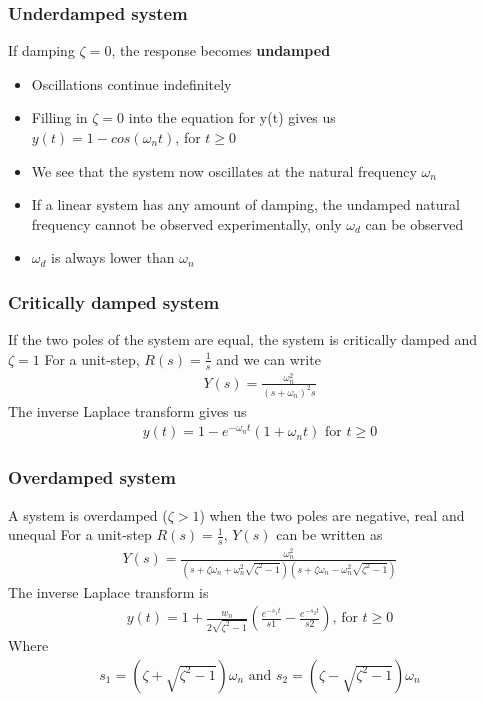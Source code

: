 \begin{frame}
\frametitle{Underdamped system}
If damping $\zeta=0$, the response becomes \textbf{undamped}
\begin{itemize}
\vspace{0.25cm}
\item Oscillations continue indefinitely
\vspace{0.25cm}
\item Filling in $\zeta=0$ into the equation for y(t) gives us\\
$y(t) = 1 -cos(\omega_n t)$, for $t\ge 0$
\vspace{0.25cm}
\item We see that the system now oscillates at the natural frequency $\omega_n$
\vspace{0.25cm}
\item If a linear system has any amount of damping, the undamped natural frequency cannot be observed experimentally, only $\omega_d$ can be observed
\vspace{0.25cm}
\item $\omega_d$ is always lower than $\omega_n$
\end{itemize} 
\end{frame}

\begin{frame}
\frametitle{Critically damped system}
If the two poles of the system are equal, the system is critically damped and $\zeta=1$
\vspace{0.75cm}
For a unit-step, $R(s)=\frac{1}{s}$ and we can write
\begin{align*}
Y(s) =\frac{\omega_n ^2}{(s+\omega_n)^2 s}
\end{align*}
The inverse Laplace transform gives us
\begin{align*}
y(t) = 1 - e^{-\omega_n t}(1+\omega_n t) \text{ for } t\ge 0
\end{align*}         
\end{frame}

\begin{frame}
\frametitle{Overdamped system}
A system is overdamped ($\zeta>1$) when the two poles are negative, real and unequal
\vspace{0.25cm}
For a unit-step $R(s)=\frac{1}{s}$, $Y(s)$ can be written as
\vspace{-0.5cm}
\begin{align*}
Y(s) = \frac{\omega_n ^2}{(s+\zeta\omega_n + \omega_n ^2\sqrt{\zeta^2 -1})(s+\zeta\omega_n - \omega_n ^2\sqrt{\zeta^2 -1})}
\end{align*} 
The inverse Laplace transform is
\vspace{-0.5cm}
\begin{align*}
y(t) = 1 +\frac{w_n}{2\sqrt{\zeta^2-1}}(\frac{e^{-s_1 t}}{s1} - \frac{e^{-s_2 t}}{s2})\text{, for } t\ge 0
\end{align*}
Where
\vspace{-0.5cm}
\begin{align*}
s_1 = (\zeta +\sqrt{\zeta^2 -1})\omega_n\text{ and } s_2 = (\zeta -\sqrt{\zeta^2 -1})\omega_n
\end{align*}
\end{frame}

